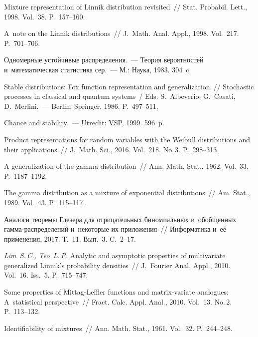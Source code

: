 \begin{multicols}{2}
{{\begin{thebibliography}{99}
 Mixture representation of Linnik distribution
revisited~// Stat. Probabil. Lett., 1998. Vol.~38. P.~157--160.

 A~note on the Linnik distributions~// J.~Math. Anal. Appl., 1998. Vol.~217. P.~701--706.

 Одномерные устойчивые распределения.~--- 
Теория вероятностей и~математическая статистика сер.~---
М.: Наука, 1983. 304~c. 

 Stable distributions: Fox function
representation and generalization~//  Stochastic processes in classical and quantum
systems~/ Eds. S.~Albeverio, G.~Casati, D.~Merlini.~--- 
Berlin: Springer, 1986. P.~497--511.

 Chance and stability.~--- 
Utrecht: VSP, 1999. 596~p.

 Product representations for random variables with the
 Weibull distributions and their applications~// J.~Math. Sci., 2016. Vol.~218. No.\,3. P.~298--313.

 A generalization of the gamma distribution~//
Ann. Math. Stat., 1962. Vol.~33. P.~1187--1192.

 The gamma distribution as a mixture of
exponential distributions~// Am. Stat., 1989. Vol.~43. P.~115--117.

 Аналоги теоремы Глезера для отрицательных биномиальных 
и~обобщенных гам\-ма-рас\-пре\-де\-ле\-ний и~некоторые их приложения~// 
Информатика и~её применения, 2017. Т.~11. Вып.~3. C.~2--17.

 {\it Lim~S.\,C., Teo~L.\,P.} Analytic and asymptotic properties of
multivariate generalized Linnik's probability densities~// J.~Fourier Anal.
Appl., 2010. Vol.~16. Iss.~5. P.~715--747.

 Some properties of Mittag-Leffler functions and
matrix-variate analogues: A~statistical perspective~// Fract. Calc. 
Appl. Anal., 2010. Vol.~13. No.\,2. P.~113--132.

 Identifiability of mixtures~// Ann. Math. Stat., 1961. 
Vol.~32. P.~244--248.


\end{thebibliography}}}
\end{multicols}
